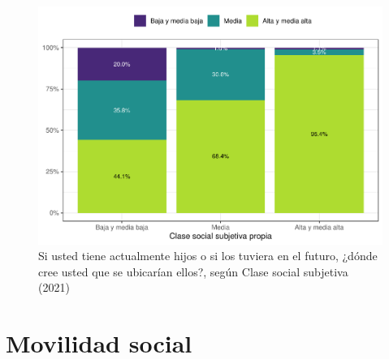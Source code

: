 \documentclass[
  12pt,
]{book}
\begin{document}
\begin{figure}

{\centering \includegraphics{reporte-elsoc_files/figure-latex/esshijos-ess-1} 

}

\caption{Si usted tiene actualmente hijos o si los tuviera en el futuro, ¿dónde cree usted que se ubicarían ellos?, según Clase social subjetiva (2021)}\label{fig:esshijos-ess}
\end{figure}

\hypertarget{movilidad-social}{%
\section{Movilidad social}\label{movilidad-social}}
\end{document}
